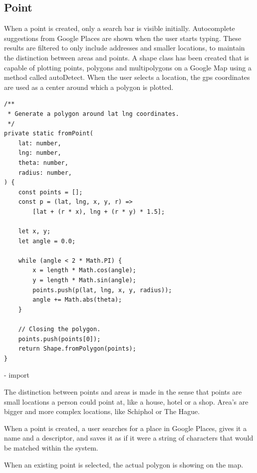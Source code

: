 \subsection{Point}
When a point is created, only a search bar is visible initially. Autocomplete suggestions from Google Places are shown when the user starts typing. These results are filtered to only include addresses and smaller locations, to maintain the distinction between areas and points. A shape class has been created that is capable of plotting points, polygons and multipolygons on a Google Map using a method called autoDetect. When the user selects a location, the gps coordinates are used as a center around which a polygon is plotted.

\begin{center}
\noindent\begin{minipage}{.85\textwidth}
\begin{lstlisting}[caption={Generating Polygon From Point.}, label={lst:Generating Polygon From Point}]
/**
 * Generate a polygon around lat lng coordinates.
 */
private static fromPoint(
	lat: number,
	lng: number,
	theta: number,
	radius: number,
) {
	const points = [];
	const p = (lat, lng, x, y, r) =>
		[lat + (r * x), lng + (r * y) * 1.5];

	let x, y;
	let angle = 0.0;

	while (angle < 2 * Math.PI) {
		x = length * Math.cos(angle);
		y = length * Math.sin(angle);
		points.push(p(lat, lng, x, y, radius));
		angle += Math.abs(theta);
	}

	// Closing the polygon.
	points.push(points[0]);
	return Shape.fromPolygon(points);
}
\end{lstlisting}
\end{minipage}
\end{center}



- import

The distinction between points and areas is made in the sense that points are small locations a person could point at, like a house, hotel or a shop. Area's are bigger and more complex locations, like Schiphol or The Hague.

When a point is created, a user searches for a place in Google Places, gives it a name and a descriptor, and saves it as if it were a string of characters that would be matched within the system.

When an existing point is selected, the actual polygon is showing on the map.

